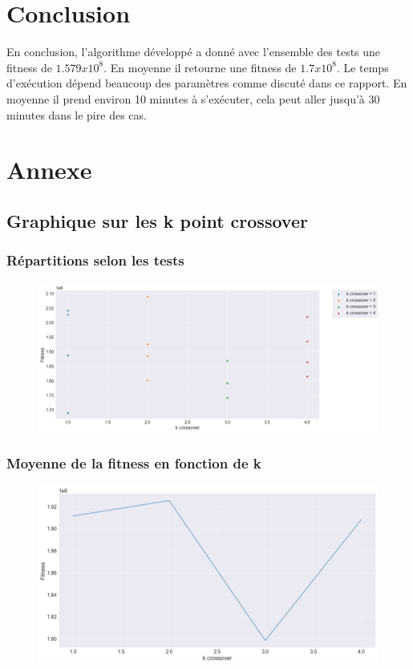 \documentclass{article} %
\begin{document}
\section{Conclusion}
En conclusion, l'algorithme développé a donné avec l'ensemble des tests une fitness de $1.579x10^8$. En moyenne il retourne une fitness de $1.7x10^8$. Le temps d'exécution dépend beaucoup des paramètres comme discuté dans ce rapport. En moyenne il prend environ 10 minutes à s'exécuter, cela peut aller jusqu'à 30 minutes dans le pire des cas.

\newpage
\section{Annexe}
\subsection{Graphique sur les k point crossover}
\subsubsection{Répartitions selon les tests}
\begin{figure}[!h]
	\centering
	\includegraphics[keepaspectratio = true,scale=0.65]{kcross.png}
\end{figure}
\subsubsection{Moyenne de la fitness en fonction de k}
\begin{figure}[!h]
	\centering
	\includegraphics[keepaspectratio = true,scale=0.65]{kcross_mean.png}
\end{figure}
\end{document}
